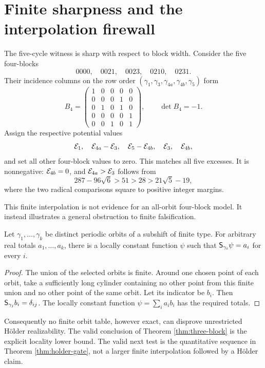 \section{Finite sharpness and the interpolation firewall}

The five-cycle witness is sharp with respect to block width.  Consider the
five four-blocks
\[
 0000,\quad0021,\quad0023,\quad0210,\quad0231.
\]
Their incidence columns on the row order
\((\gamma_1,\gamma_3,\gamma_{4a},\gamma_{4b},\gamma_5)\) form
\begin{equation}\label{eq:width4-matrix}
 B_4=
 \begin{pmatrix}
 1&0&0&0&0\\
 0&0&0&1&0\\
 0&1&0&1&0\\
 0&0&0&0&1\\
 0&0&1&0&1
 \end{pmatrix},
 \qquad \det B_4=-1.
\end{equation}
Assign the respective potential values
\begin{equation}\label{eq:width4-values}
 \mathcal E_1,\quad
 \mathcal E_{4a}-\mathcal E_3,\quad
 \mathcal E_5-\mathcal E_{4b},\quad
 \mathcal E_3,\quad
 \mathcal E_{4b},
\end{equation}
and set all other four-block values to zero.  This matches all five excesses.
It is nonnegative: \(\mathcal E_{4b}=0\), and
\(\mathcal E_{4a}>\mathcal E_3\) follows from
\[
 287-96\sqrt6>51>28>21\sqrt5-19,
\]
where the two radical comparisons square to positive integer margins.

This finite interpolation is not evidence for an all-orbit four-block model.
It instead illustrates a general obstruction to finite falsification.

\begin{proposition}\label{prop:finite-interpolation}
Let \(\gamma_1,\ldots,\gamma_k\) be distinct periodic orbits of a subshift of
finite type.  For arbitrary real totals \(a_1,\ldots,a_k\), there is a
locally constant function \(\psi\) such that
\(\mathsf S_{\gamma_i}\psi=a_i\) for every \(i\).
\end{proposition}

\begin{proof}
The union of the selected orbits is finite.  Around one chosen point of each
orbit, take a sufficiently long cylinder containing no other point from this
finite union and no other point of the same orbit.  Let its indicator be
\(b_i\).  Then \(\mathsf S_{\gamma_j}b_i=\delta_{ij}\).  The locally constant
function \(\psi=\sum_i a_i b_i\) has the required totals.
\end{proof}

Consequently no finite orbit table, however exact, can disprove unrestricted
H\"older realizability.  The valid conclusion of Theorem
\ref{thm:three-block} is the explicit locality lower bound.  The valid next
test is the quantitative sequence in Theorem \ref{thm:holder-gate}, not a
larger finite interpolation followed by a H\"older claim.
